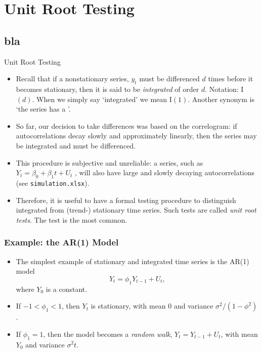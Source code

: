 

\frame{\titlepage}


\section{Unit Root Testing}\subsection*{bla}
\begin{frame}{Unit Root Testing}
\begin{itemize}
\item Recall that if a nonstationary series, $y_t$ must be differenced
$d$ times before it becomes stationary, then it is said to be \emph{\color{red}integrated} of order $d$. Notation: I$(d)$. When we simply say
`integrated' we mean I$(1)$. Another synonym is `the series has a '.

\item So far, our decision to take differences was
based on the correlogram: if autocorrelations decay
slowly and approximately linearly, then the series may be integrated and must
be differenced.

\item This procedure is subjective and unreliable:
 a  series, such as $Y_{t}=\beta_0 +\beta_1 t+U_{t}$%
, will also have large and slowly decaying autocorrelations (see \texttt{simulation.xlsx}).

\item  Therefore, it
is useful to have a formal testing procedure to distinguish integrated from
(trend-) stationary time series. Such tests are called \emph{\color{red}unit root
tests}. The  test is the most common.


\end{itemize}
\end{frame}
\begin{frame}
\frametitle{Example: the AR(1) Model}

\begin{itemize}
\item The simplest example of stationary and integrated time series is
the AR(1) model
\begin{equation*}
Y_{t}=\phi_1 Y_{t-1}+U_{t},
\end{equation*}%
where $Y_0$ is a constant.

\item If $-1<\phi_1 <1$, then $Y_{t}$ is stationary, with mean $0$ and
variance $\sigma ^{2}/(1-\phi ^{2})$.

\item If $\phi_1 =1$, then the model becomes a \emph{\color{red}random walk}, $%
Y_{t}=Y_{t-1}+U_{t}$, with mean $Y_{0}$ and variance $\sigma ^{2}t$.
\end{itemize}
\end{frame}
